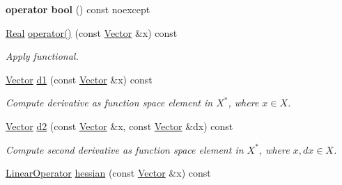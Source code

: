\begin{DoxyCompactItemize}
\item 
\hypertarget{classSpacy_1_1C2Functional_a7305181d522d504c75c0647737fe7d15}{{\bfseries operator bool} () const noexcept}\label{classSpacy_1_1C2Functional_a7305181d522d504c75c0647737fe7d15}

\item 
\hypertarget{classSpacy_1_1C2Functional_a5dad5f40836b6f43662db0a01fd32347}{\hyperlink{classSpacy_1_1Real}{Real} \hyperlink{classSpacy_1_1C2Functional_a5dad5f40836b6f43662db0a01fd32347}{operator()} (const \hyperlink{classSpacy_1_1Vector}{Vector} \&x) const }\label{classSpacy_1_1C2Functional_a5dad5f40836b6f43662db0a01fd32347}

\begin{DoxyCompactList}\small\item\em Apply functional. \end{DoxyCompactList}\item 
\hypertarget{classSpacy_1_1C2Functional_a7278ddf3337cc28d138a02d18ad44404}{\hyperlink{classSpacy_1_1Vector}{Vector} \hyperlink{classSpacy_1_1C2Functional_a7278ddf3337cc28d138a02d18ad44404}{d1} (const \hyperlink{classSpacy_1_1Vector}{Vector} \&x) const }\label{classSpacy_1_1C2Functional_a7278ddf3337cc28d138a02d18ad44404}

\begin{DoxyCompactList}\small\item\em Compute derivative as function space element in $X^*$, where $x\in X$. \end{DoxyCompactList}\item 
\hypertarget{classSpacy_1_1C2Functional_af2f8671e8ebb9079255afc39a495859d}{\hyperlink{classSpacy_1_1Vector}{Vector} \hyperlink{classSpacy_1_1C2Functional_af2f8671e8ebb9079255afc39a495859d}{d2} (const \hyperlink{classSpacy_1_1Vector}{Vector} \&x, const \hyperlink{classSpacy_1_1Vector}{Vector} \&dx) const }\label{classSpacy_1_1C2Functional_af2f8671e8ebb9079255afc39a495859d}

\begin{DoxyCompactList}\small\item\em Compute second derivative as function space element in $X^*$, where $x,dx\in X$. \end{DoxyCompactList}\item 
\hypertarget{classSpacy_1_1C2Functional_a97eeeb376ed178ea7e2f109967f99c24}{\hyperlink{classSpacy_1_1LinearOperator}{Linear\-Operator} \hyperlink{classSpacy_1_1C2Functional_a97eeeb376ed178ea7e2f109967f99c24}{hessian} (const \hyperlink{classSpacy_1_1Vector}{Vector} \&x) const }\label{classSpacy_1_1C2Functional_a97eeeb376ed178ea7e2f109967f99c24}


\end{DoxyCompactItemize}

